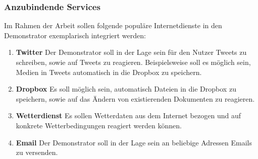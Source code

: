 \subsubsection{Anzubindende Services}
\label{subsec:anzubindende_services}
Im Rahmen der Arbeit sollen folgende populäre Internetdienste in den Demonstrator exemplarisch integriert werden:
\begin{enumerate}
\item \textbf{Twitter} Der Demonstrator soll in der Lage sein für den Nutzer Tweets zu schreiben, sowie auf Tweets zu reagieren. Beispielsweise soll es möglich sein, Medien in Tweets automatisch in die Dropbox zu speichern.
\item \textbf{Dropbox} Es soll möglich sein, automatisch Dateien in die Dropbox zu speichern, sowie auf das Ändern von existierenden Dokumenten zu reagieren.
\item \textbf{Wetterdienst} Es sollen Wetterdaten aus dem Internet bezogen und auf konkrete Wetterbedingungen reagiert werden können.
\item \textbf{Email} Der Demonstrator soll in der Lage sein an beliebige Adressen Emails zu versenden.
\end{enumerate}



